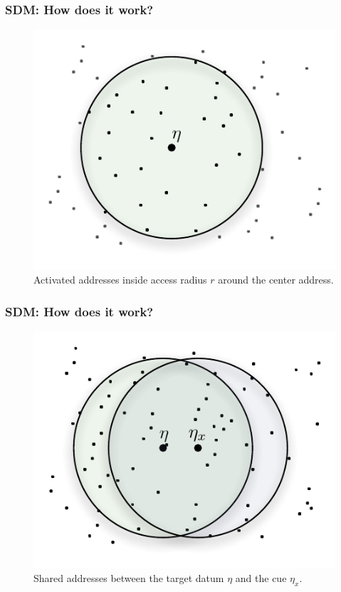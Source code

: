 \documentclass{beamer}
\begin{document}
\begin{frame}
\frametitle{SDM: How does it work?}

\begin{figure}
\centering\includegraphics[scale=0.75]{./images02/p_circle_r.pdf}
\caption{Activated addresses inside access radius $r$ around the center address.}
\end{figure}

\end{frame}


\begin{frame}
\frametitle{SDM: How does it work?}
\begin{figure}
\centering\includegraphics[scale=0.75]{./images02/p1_inter_p2.pdf}
\caption{Shared addresses between the target datum $\eta$ and the cue $\eta_{x}$.}
\end{figure}
\end{frame}
\end{document}
